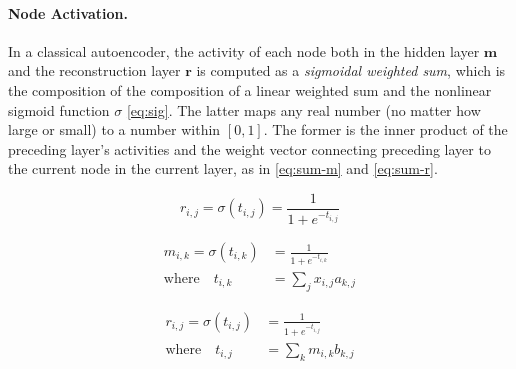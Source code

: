 \paragraph{Node Activation.} In a classical autoencoder, the activity of each node 
both in the hidden layer $\textbf{m}$ and the reconstruction layer $\textbf{r}$ is 
computed as a \emph{sigmoidal weighted sum}, which is the composition of the 
composition of a linear weighted sum and the nonlinear sigmoid function $\sigma$ \eqref{eq:sig}. 
The latter maps any real number (no matter how large or small) to a number within $[0,1]$.
The former is the inner product of the preceding layer's activities and the 
weight vector connecting preceding layer to the current node in the 
current layer, as in \eqref{eq:sum-m} and \eqref{eq:sum-r}.

	\begin{equation} %
	\label{eq:sig}
	r_{i,j} =\sigma(t_{i,j}) = \frac{1}{1 + e^{-t_{i,j}}} 
	\end{equation} %
	
	\begin{align} %
	\label{eq:sig-m}
	m_{i,k} =\sigma(t_{i,k}) &= \frac{1}{1 + e^{-t_{i,k}}} \\
	\label{eq:sum-r}
	\text{where} \quad t_{i,k} &= \sum_{j} x_{i,j} a_{k,j}  
	\end{align}
	
	\begin{align} %
	\label{eq:sig-r}
	r_{i,j} =\sigma(t_{i,j}) &= \frac{1}{1 + e^{-t_{i,j}}} \\ %
	\label{eq:sum-r}
	\text{where} \quad t_{i,j} &= \sum_{k} m_{i,k} b_{k,j} 
	\end{align}
	
